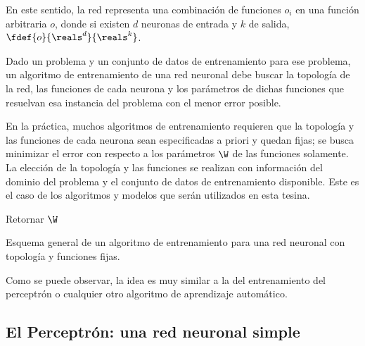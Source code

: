 
En este sentido, la red representa una combinación de funciones $o_i$ en una función arbitraria $o$, donde si existen $d$ neuronas de entrada y $k$ de salida, $\fdef{o}{\reals^d}{\reals^k}$.

Dado un problema y un conjunto de datos de entrenamiento para ese problema, un algoritmo de entrenamiento de una red neuronal debe buscar la topología de la red, las funciones de cada neurona y los parámetros de dichas funciones que resuelvan esa instancia del problema con el menor error posible.

En la práctica, muchos algoritmos de entrenamiento requieren que la topología y las funciones de cada neurona sean especificadas a priori y quedan fijas; se busca minimizar el error con respecto a los parámetros $\W$ de las funciones solamente. La elección de la topología y las funciones se realizan con información del dominio del problema y el conjunto de datos de entrenamiento disponible. Este es el caso de los algoritmos y modelos que serán utilizados en esta tesina.


\begin{algorithm}[H]

Retornar $\W$\;
\caption{Esquema general de un algoritmo de entrenamiento para una red neuronal con topología y funciones fijas.} 
\end{algorithm}
\vspace{10pt}

Como se puede observar, la idea es muy similar a la del entrenamiento del perceptrón o cualquier otro algoritmo de aprendizaje automático.

\subsection{El Perceptrón: una red neuronal simple}

